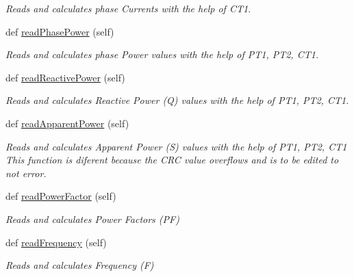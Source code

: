 \begin{DoxyCompactItemize}
\begin{DoxyCompactList}\small\item\em Reads and calculates phase Currents with the help of C\+T1. \end{DoxyCompactList}\item 
def \hyperlink{class_m_i_c3_1_1_m_i_c1_a2cb7738a71fa4b3782ad6df585ed288a}{read\+Phase\+Power} (self)
\begin{DoxyCompactList}\small\item\em Reads and calculates phase Power values with the help of P\+T1, P\+T2, C\+T1. \end{DoxyCompactList}\item 
def \hyperlink{class_m_i_c3_1_1_m_i_c1_a8d7c0913d3999f6f7737d6ffc56383a3}{read\+Reactive\+Power} (self)
\begin{DoxyCompactList}\small\item\em Reads and calculates Reactive Power (Q) values with the help of P\+T1, P\+T2, C\+T1. \end{DoxyCompactList}\item 
def \hyperlink{class_m_i_c3_1_1_m_i_c1_a1dfae003c1d98bdda449416f6108926e}{read\+Apparent\+Power} (self)
\begin{DoxyCompactList}\small\item\em Reads and calculates Apparent Power (S) values with the help of P\+T1, P\+T2, C\+T1 This function is diferent because the C\+RC value overflows and is to be edited to not error. \end{DoxyCompactList}\item 
def \hyperlink{class_m_i_c3_1_1_m_i_c1_afd04a6d0187293021a5f4f7d853ea447}{read\+Power\+Factor} (self)
\begin{DoxyCompactList}\small\item\em Reads and calculates Power Factors (PF) \end{DoxyCompactList}\item 
def \hyperlink{class_m_i_c3_1_1_m_i_c1_a4a72cfbf9d28d2810fd45c5ea3158f5d}{read\+Frequency} (self)
\begin{DoxyCompactList}\small\item\em Reads and calculates Frequency (F) \end{DoxyCompactList}\end{DoxyCompactItemize}
